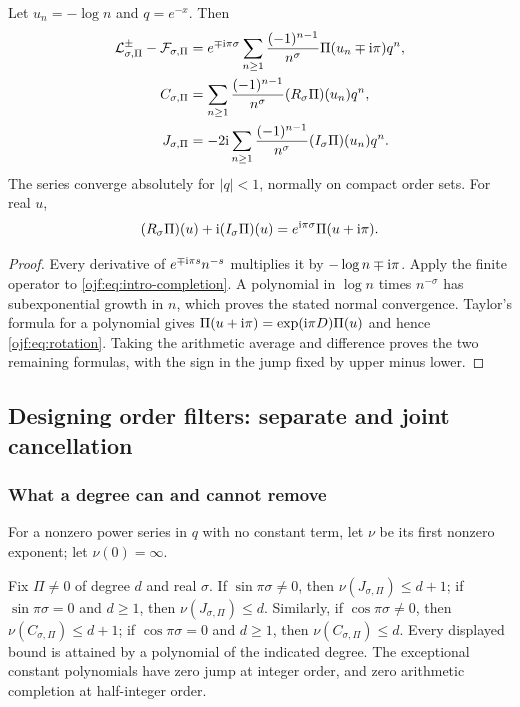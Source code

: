 \begin{theorem}\label{ojf:thm:dictionary}
Let $u_n=-\log n$ and $q=e^{-x}$. Then
\begin{align}
 \mathcal{L}^\pm_{\sigma,\Pi}-\mathcal{F}_{\sigma,\Pi}
 &=e^{\mp\mathrm{i}\pi\sigma}
       \sum_{n\ge1}\frac{(-1)^{n-1}}{n^\sigma}
                      \Pi(u_n\mp\mathrm{i}\pi)q^n,\label{ojf:eq:filter-full}\\
 C_{\sigma,\Pi}
 &=\sum_{n\ge1}\frac{(-1)^{n-1}}{n^\sigma}(R_\sigma\Pi)(u_n)q^n,
                                                        \label{ojf:eq:filter-C}\\
 J_{\sigma,\Pi}
 &=-2\mathrm{i}\sum_{n\ge1}\frac{(-1)^{n-1}}{n^\sigma}(I_\sigma\Pi)(u_n)q^n.
                                                        \label{ojf:eq:filter-J}
\end{align}
The series converge absolutely for $|q|<1$, normally on compact order
sets. For real $u$,
\begin{equation}\label{ojf:eq:rotation}
 (R_\sigma\Pi)(u)+\mathrm{i}(I_\sigma\Pi)(u)
      =e^{\mathrm{i}\pi\sigma}\Pi(u+\mathrm{i}\pi).
\end{equation}
\end{theorem}
\begin{proof}
Every derivative of
$e^{\mp\mathrm{i}\pi s}n^{-s}$ multiplies it by
$-\log n\mp\mathrm{i}\pi$. Apply the finite operator to
\eqref{ojf:eq:intro-completion}. A polynomial in $\log n$ times
$n^{-\sigma}$ has subexponential growth in $n$, which proves the stated
normal convergence. Taylor's formula for a polynomial gives
$\Pi(u+\mathrm{i}\pi)=\exp(\mathrm{i}\pi D)\Pi(u)$ and hence
\eqref{ojf:eq:rotation}. Taking the arithmetic average and difference
proves the two remaining formulas, with the sign in the jump fixed by
upper minus lower.
\end{proof}

\subsection{Designing order filters: separate and joint cancellation}
\label{ojf:sec:filters}

\subsubsection{What a degree can and cannot remove}
For a nonzero power series in $q$ with no constant term, let $\nu$ be its
first nonzero exponent; let $\nu(0)=\infty$.

\begin{theorem}\label{ojf:thm:cost}
Fix $\Pi\ne0$ of degree $d$ and real $\sigma$.
If $\sin\pi\sigma\ne0$, then $\nu(J_{\sigma,\Pi})\le d+1$;
if $\sin\pi\sigma=0$ and $d\ge1$, then
$\nu(J_{\sigma,\Pi})\le d$.
Similarly, if $\cos\pi\sigma\ne0$, then
$\nu(C_{\sigma,\Pi})\le d+1$;
if $\cos\pi\sigma=0$ and $d\ge1$, then
$\nu(C_{\sigma,\Pi})\le d$.
Every displayed bound is attained by a polynomial of the indicated degree.
The exceptional constant polynomials have zero jump at integer order,
and zero arithmetic completion at half-integer order.
\end{theorem}

